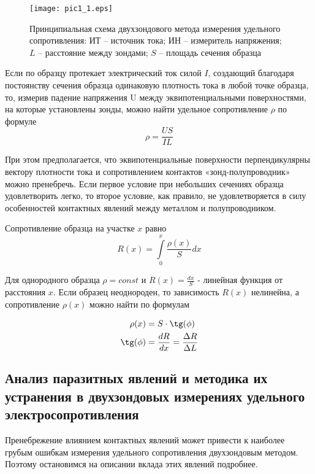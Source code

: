 \begin{figure}[h!]\centering
\texttt{[image: pic1\_1.eps]}
\caption{Принципиальная схема двухзондового метода измерения удельного сопротивления: ИТ – источник тока; ИН – измеритель напряжения; $L$ – расстояние между зондами; $S$ – площадь сечения образца}
\label{1_base_scheme}
\end{figure}

Если по образцу протекает электрический ток силой $I$, создающий благодаря постоянству сечения образца одинаковую плотность тока в любой точке образца, то, измерив падение напряжения U между эквипотенциальными поверхностями, на которые установлены зонды, можно найти удельное сопротивление $\rho$ по формуле
\begin{equation}
\rho = \frac{U S}{I L}
\end{equation}

При этом предполагается, что эквипотенциальные поверхности перпендикулярны вектору плотности тока и сопротивлением контактов «зонд-полупроводник» можно пренебречь. Если первое условие при небольших сечениях образца удовлетворить легко, то второе условие, как правило, не удовлетворяется в силу особенностей контактных явлений между металлом и полупроводником.

Сопротивление образца на участке $x$ равно
\begin{equation}
R(x) = \int\limits_{0}^{x} {\frac{\rho(x)}{S} d x}
\end{equation}

Для однородного образца $\rho = const$ и $R(x) = \frac{d x}{S}$ - линейная функция от расстояния $x$. Если образец неоднороден, то зависимость $R(x)$ нелинейна, а сопротивление $\rho(x)$ можно найти по формулам

\begin{equation}
\begin{split}
\rho(x) &= S \cdot \tg(\phi) \\
\tg(\phi) &= \frac{d R}{d x} = \frac{\Delta R}{\Delta L}
\end{split}
\label{1_rho}
\end{equation}

\subsection{Анализ паразитных явлений и методика их устранения в двухзондовых измерениях удельного электросопротивления}

Пренебрежение влиянием контактных явлений может привести к наиболее грубым ошибкам измерения удельного сопротивления двухзондовым методом. Поэтому остановимся на описании вклада этих явлений подробнее.

